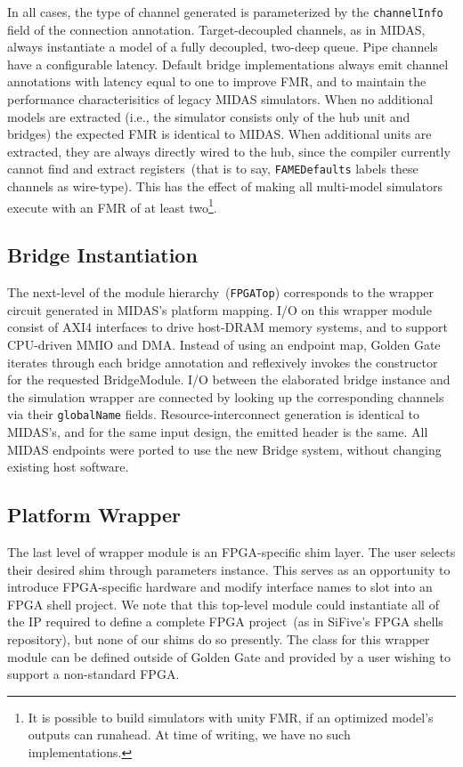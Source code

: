 In all cases, the type of channel generated is parameterized by the
\texttt{channelInfo} field of the connection annotation. Target-decoupled channels, as in
MIDAS, always instantiate a model of a fully decoupled, two-deep queue. Pipe
channels have a configurable latency. Default bridge implementations always
emit channel annotations with latency equal to one to improve FMR, and to maintain the
performance characterisitics of legacy MIDAS simulators. When no additional
models are extracted (i.e., the simulator consists only of the hub unit and
bridges) the expected FMR is identical to MIDAS.
When additional units are extracted, they are always directly wired to the
hub, since the compiler currently cannot find and extract registers~(that is to
say, \texttt{FAMEDefaults} labels these channels as wire-type). This has
the effect of making all multi-model simulators execute with an FMR of at least two\footnote{It is possible to build
simulators with unity FMR, if an optimized model's outputs can runahead. At time
of writing, we have no such implementations.}.

\subsection{Bridge Instantiation}
The next-level of the module hierarchy~(\texttt{FPGATop}) corresponds to the wrapper
circuit generated in MIDAS's platform mapping. I/O on this wrapper module consist of AXI4 interfaces
to drive host-DRAM memory systems, and to support CPU-driven MMIO and DMA.
Instead of using an endpoint map, Golden Gate iterates through each bridge
annotation and reflexively invokes the constructor for the requested
BridgeModule. I/O between the elaborated
bridge instance and the simulation wrapper are connected by looking up the
corresponding channels via their \texttt{globalName} fields.
Resource-interconnect generation is identical to MIDAS's, and for the same
input design, the emitted header is the same. All MIDAS endpoints were ported
to use the new Bridge system, without changing existing host software.

\subsection{Platform Wrapper}
The last level of wrapper module is an FPGA-specific shim layer. The user
selects their desired shim through parameters instance. This serves as an
opportunity to introduce FPGA-specific hardware and modify interface names to
slot into an FPGA shell project. We note that this top-level module could
instantiate all of the IP required to define a complete FPGA project~(as in
SiFive's FPGA shells repository), but none of our shims do so presently. The
class for this wrapper module can be defined outside of Golden Gate and
provided by a user wishing to support a non-standard FPGA.

